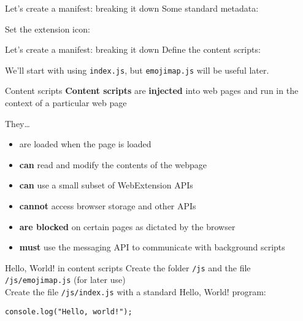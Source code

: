 \documentclass[../index.tex]{subfiles}
\begin{document}
\renewcommand{\currenttitle}{Let's create a manifest: breaking it down}
\begin{frame}[fragile]{\currenttitle}
  Some standard metadata:
  

  Set the extension icon:
  
\end{frame}

\begin{frame}[fragile]{\currenttitle}
  Define the content scripts:
  

  We'll start with using \texttt{index.js}, but \texttt{emojimap.js} will be
  useful later.
\end{frame}

\renewcommand{\currenttitle}{Content scripts}
\begin{frame}[fragile]{\currenttitle}
  \textbf{Content scripts} are \textbf{injected} into web pages and run in the
  context of a particular web page

  They\dots
  \begin{itemize}
    \item are loaded when the page is loaded
    \item \textbf{can} read and modify the contents of the webpage
    \item \textbf{can} use a small subset of WebExtension APIs
    \item \textbf{cannot} access browser storage and other APIs
    \item \textbf{are blocked} on certain pages as dictated by the browser
    \item \textbf{must} use the messaging API to communicate with background scripts
  \end{itemize}
\end{frame}

\renewcommand{\currenttitle}{Hello, World! in content scripts}
\begin{frame}[fragile]{\currenttitle}
  Create the folder \texttt{/js} and the file \texttt{/js/emojimap.js} (for later use) \\[1.5em]

  Create the file \texttt{/js/index.js} with a standard Hello, World! program:
  \begin{lstlisting}[language=ES6,basicstyle=\ttfamily\small]
    console.log("Hello, world!");
  \end{lstlisting}
\end{frame}
\end{document}

